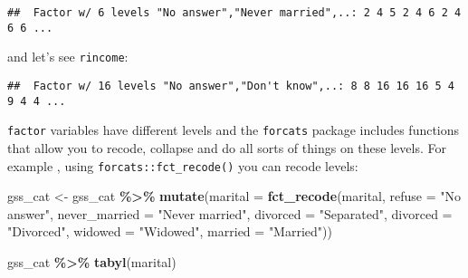 \documentclass[
]{article}
\newenvironment{Shaded}{\begin{snugshade}}{\end{snugshade}}
\newcommand{\DataTypeTok}[1]{\textcolor[rgb]{0.13,0.29,0.53}{#1}}
\newcommand{\KeywordTok}[1]{\textcolor[rgb]{0.13,0.29,0.53}{\textbf{#1}}}
\newcommand{\NormalTok}[1]{#1}
\newcommand{\OperatorTok}[1]{\textcolor[rgb]{0.81,0.36,0.00}{\textbf{#1}}}
\newcommand{\StringTok}[1]{\textcolor[rgb]{0.31,0.60,0.02}{#1}}
\begin{document}
\begin{Shaded}
\end{Shaded}

\begin{verbatim}
##  Factor w/ 6 levels "No answer","Never married",..: 2 4 5 2 4 6 2 4 6 6 ...
\end{verbatim}

and let's see \texttt{rincome}:

\begin{Shaded}
\end{Shaded}

\begin{verbatim}
##  Factor w/ 16 levels "No answer","Don't know",..: 8 8 16 16 16 5 4 9 4 4 ...
\end{verbatim}

\texttt{factor} variables have different levels and the \texttt{forcats} package includes functions that allow
you to recode, collapse and do all sorts of things on these levels. For example , using
\texttt{forcats::fct\_recode()} you can recode levels:

\begin{Shaded}
\begin{Highlighting}[]
\NormalTok{gss\_cat \textless{}{-}}\StringTok{ }\NormalTok{gss\_cat }\OperatorTok{\%\textgreater{}\%}
\StringTok{  }\KeywordTok{mutate}\NormalTok{(}\DataTypeTok{marital =} \KeywordTok{fct\_recode}\NormalTok{(marital,}
                              \DataTypeTok{refuse =} \StringTok{"No answer"}\NormalTok{,}
                              \DataTypeTok{never\_married =} \StringTok{"Never married"}\NormalTok{,}
                              \DataTypeTok{divorced =} \StringTok{"Separated"}\NormalTok{,}
                              \DataTypeTok{divorced =} \StringTok{"Divorced"}\NormalTok{,}
                              \DataTypeTok{widowed =} \StringTok{"Widowed"}\NormalTok{,}
                              \DataTypeTok{married =} \StringTok{"Married"}\NormalTok{))}

\NormalTok{gss\_cat }\OperatorTok{\%\textgreater{}\%}
\StringTok{  }\KeywordTok{tabyl}\NormalTok{(marital)}
\end{Highlighting}
\end{Shaded}
\end{document}

